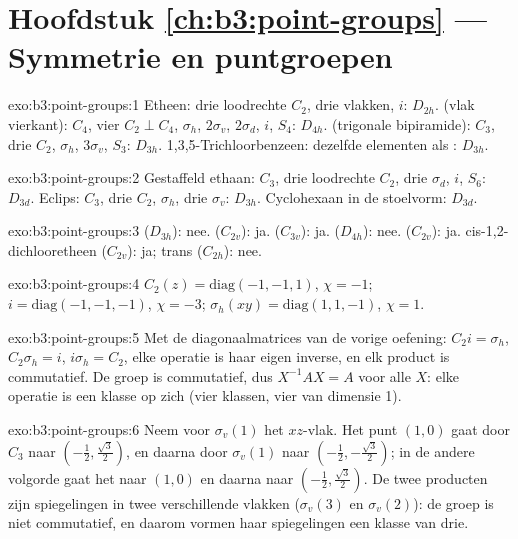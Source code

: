 \section*{Hoofdstuk \ref{ch:b3:point-groups} --- Symmetrie en puntgroepen}

\begin{solution}{exo:b3:point-groups:1}
Etheen: drie loodrechte $C_2$, drie vlakken, $i$: $D_{2h}$.  (vlak
vierkant): $C_4$, vier $C_2 \perp C_4$, $\sigma_h$, $2\sigma_v$, $2\sigma_d$, $i$, $S_4$:
$D_{4h}$.  (trigonale bipiramide): $C_3$, drie $C_2$, $\sigma_h$, $3\sigma_v$,
$S_3$: $D_{3h}$. 1,3,5-Trichloorbenzeen: dezelfde elementen als : $D_{3h}$.
\end{solution}

\begin{solution}{exo:b3:point-groups:2}
Gestaffeld ethaan: $C_3$, drie loodrechte $C_2$, drie $\sigma_d$, $i$, $S_6$:
$D_{3d}$. Eclips: $C_3$, drie $C_2$, $\sigma_h$, drie $\sigma_v$: $D_{3h}$.
Cyclohexaan in de stoelvorm: $D_{3d}$.
\end{solution}

\begin{solution}{exo:b3:point-groups:3}
 ($D_{3h}$): nee.  ($C_{2v}$): ja.  ($C_{3v}$): ja.
 ($D_{4h}$): nee.  ($C_{2v}$): ja. cis-1,2-dichlooretheen
($C_{2v}$): ja; trans ($C_{2h}$): nee.
\end{solution}

\begin{solution}{exo:b3:point-groups:4}
$C_2(z) = \mathrm{diag}(-1,-1,1)$, $\chi = -1$; $i = \mathrm{diag}(-1,-1,-1)$,
$\chi = -3$; $\sigma_h(xy) = \mathrm{diag}(1,1,-1)$, $\chi = 1$.
\end{solution}

\begin{solution}{exo:b3:point-groups:5}
Met de diagonaalmatrices van de vorige oefening: $C_2i = \sigma_h$, $C_2\sigma_h =
i$, $i\sigma_h = C_2$, elke operatie is haar eigen inverse, en elk product
is commutatief. De groep is commutatief, dus $X^{-1}AX = A$ voor alle $X$:
elke operatie is een klasse op zich (vier klassen, vier  van dimensie 1).
\end{solution}

\begin{solution}{exo:b3:point-groups:6}
Neem voor $\sigma_v(1)$ het $xz$-vlak. Het punt $(1,0)$ gaat door $C_3$ naar $(-\frac12,
\frac{\sqrt3}2)$, en daarna door $\sigma_v(1)$ naar $(-\frac12,-\frac{\sqrt3}2)$; in de
andere volgorde gaat het naar $(1,0)$ en daarna naar $(-\frac12,\frac{\sqrt3}2)$. De twee
producten zijn spiegelingen in twee verschillende vlakken ($\sigma_v(3)$ en
$\sigma_v(2)$): de groep is niet commutatief, en daarom vormen haar
spiegelingen een klasse van drie.
\end{solution}

